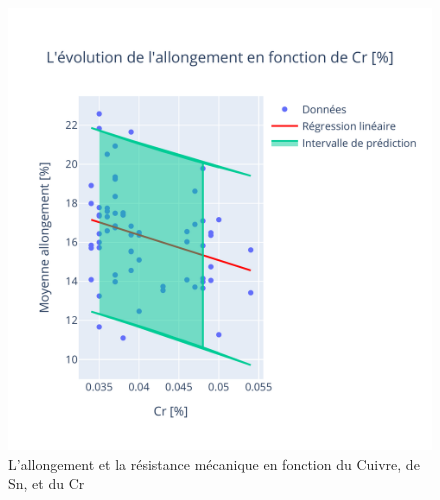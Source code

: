 \documentclass[12pt]{article}
\begin{document}
\begin{figure}[H]
{\begin{minipage}{0.8\textwidth}
        \end{minipage}
        \hspace{0.01\textwidth}  %
        \begin{minipage}{0.8\textwidth}
            \centering
            \includegraphics[width=\textwidth]{Images/Statistique/Regression_Cr_Allongement.pdf}
        \end{minipage}
    }
    \caption{L'allongement et la résistance mécanique en fonction du Cuivre, de Sn, et du Cr}
    \label{fig:regression2}
\end{figure}
\end{document}
